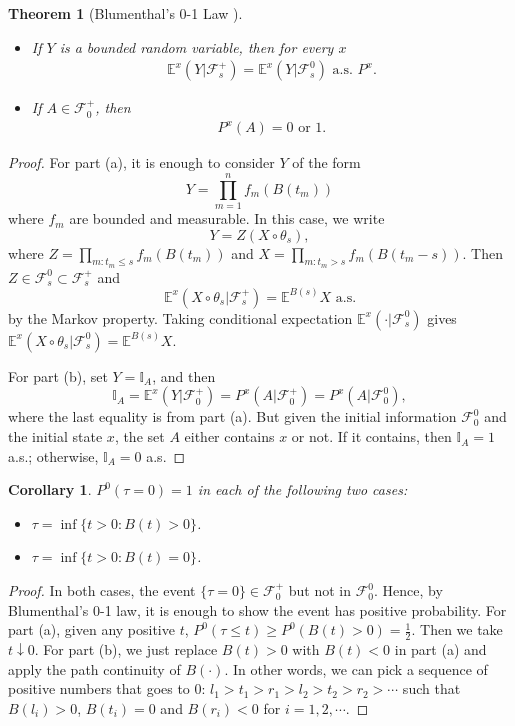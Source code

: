 \documentclass{article}
\theoremstyle{plain}
\newtheorem{theorem}{Theorem}
\newtheorem{corollary}{Corollary}
\theoremstyle{definition}
\begin{document}
\begin{theorem}[Blumenthal's 0-1 Law \citep{liggett2010continuous}]
\begin{itemize}
    \item[(a)] If $Y$ is a bounded random variable, then for every $x$
    \begin{align}
        \mathbb{E}^x(Y|\mathcal{F}_s^+) = \mathbb{E}^x(Y|\mathcal{F}_s^0)\text{ a.s. }P^x.
    \end{align}
    \item[(b)] If $A \in \mathcal{F}_0^+$, then
    \begin{align}
        P^x(A) = 0\text{ or }1.
    \end{align}
\end{itemize}
\end{theorem}

\begin{proof}
For part (a), it is enough to consider $Y$ of the form 
\[
Y = \prod_{m=1}^n f_m(B(t_m))
\]
where $f_m$ are bounded and measurable. In this case, we write
\[
Y = Z(X\circ\theta_s),
\]
where $Z = \prod_{m:t_m\le s} f_m(B(t_m))$ and $X = \prod_{m:t_m>s} f_m(B(t_m-s))$. Then $Z\in\mathcal{F}_s^0 \subset\mathcal{F}_s^+$ and
\[
\mathbb{E}^x(X\circ\theta_s|\mathcal{F}_s^+) = \mathbb{E}^{B(s)}X \text{ a.s.}
\]
by the Markov property. Taking conditional expectation $\mathbb{E}^x(\cdot|\mathcal{F}_s^0)$ gives $\mathbb{E}^x(X\circ\theta_s|\mathcal{F}_s^0)=\mathbb{E}^{B(s)}X$.

For part (b), set $Y = \mathbb{I}_A$, and then
\[
\mathbb{I}_A = \mathbb{E}^x(Y|\mathcal{F}_0^+) = P^x(A|\mathcal{F}_0^+) = P^x(A|\mathcal{F}_0^0),
\]
where the last equality is from part (a). But given the initial information $\mathcal{F}_0^0$ and the initial state $x$, the set $A$ either contains $x$ or not. If it contains, then $\mathbb{I}_A = 1$ a.s.; otherwise, $\mathbb{I}_A = 0$ a.s.
\end{proof}

\begin{corollary} 
$P^0(\tau=0) = 1$ in each of the following two cases:
\begin{itemize}
    \item[(a)] $\tau = \inf\{t > 0 : B(t) > 0\}$.
    \item[(b)] $\tau = \inf\{t > 0 : B(t) = 0\}$.
\end{itemize}
\end{corollary}

\begin{proof}
In both cases, the event $\{\tau=0\}\in\mathcal{F}_0^+$ but not in $\mathcal{F}_0^0$. Hence, by Blumenthal's 0-1 law, it is enough to show the event has positive probability. For part (a), given any positive $t$, $P^0(\tau\le t) \ge P^0(B(t) > 0) = \frac{1}{2}$. Then we take $t\downarrow 0$. For part (b), we just replace $B(t)>0$ with $B(t)<0$ in part (a) and apply the path continuity of $B(\cdot)$. In other words, we can pick a sequence of positive numbers that goes to $0$: $l_1 > t_1 > r_1 > l_2 > t_2 > r_2 > \cdots$ such that $B(l_i)>0$, $B(t_i)=0$ and $B(r_i)<0$ for $i=1,2,\cdots$.
\end{proof}
\end{document}
